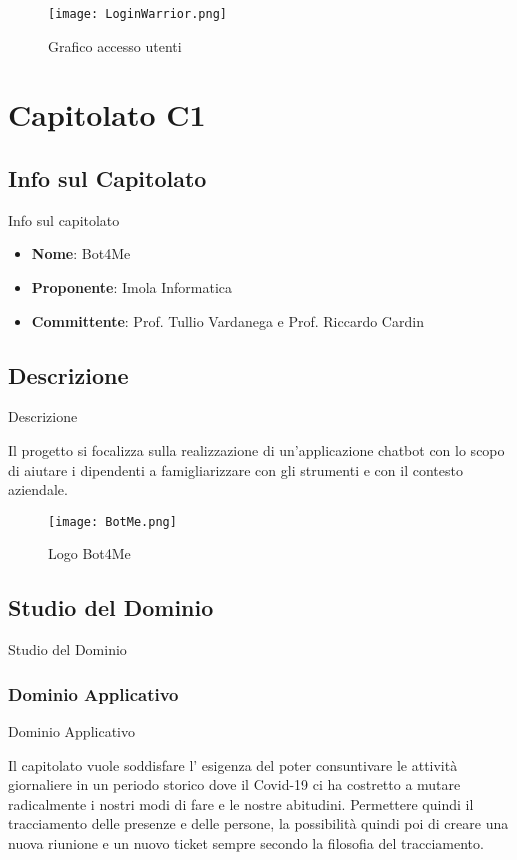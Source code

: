 \documentclass[11pt]{article}
\begin{document}
    \begin{figure}[h!]
        \centering
        \texttt{[image: LoginWarrior.png]}
        \caption{Grafico accesso utenti}
        \label{zucchetti}
    \end{figure}


\newpage

\section{Capitolato C1}
    \subsection{Info sul Capitolato} Info sul capitolato
    \begin{itemize}
        \item \textbf{Nome}: Bot4Me
        \item \textbf{Proponente}: Imola Informatica
        \item \textbf{Committente}: Prof. Tullio Vardanega e Prof. Riccardo Cardin
    \end{itemize}
    \subsection{Descrizione} Descrizione
    
    Il progetto si focalizza sulla realizzazione di un’applicazione chatbot con lo scopo di aiutare i dipendenti a famigliarizzare con gli strumenti e con il contesto aziendale.
    
    \begin{figure}[h!]
        \centering
        \texttt{[image: BotMe.png]}
        \caption{Logo Bot4Me}
        \label{Bot4Me}
    \end{figure} 
    
    \subsection{Studio del Dominio} Studio del Dominio
        \subsubsection{Dominio Applicativo} Dominio Applicativo
        
        Il capitolato vuole soddisfare l' esigenza del poter consuntivare le attività giornaliere in un periodo storico dove il Covid-19 ci ha costretto a mutare radicalmente i nostri modi di fare e le nostre abitudini.
        Permettere quindi il tracciamento delle presenze e delle persone, la possibilità quindi poi di creare una nuova riunione e un nuovo ticket sempre secondo la filosofia del tracciamento.
\end{document}

